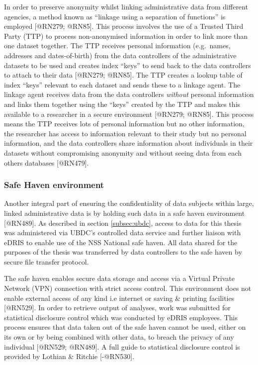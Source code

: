 \documentclass[]{article}
\begin{document}
In order to preserve anonymity whilst linking administrative data from
different agencies, a method known as ``linkage using a separation of
functions'' is employed {[}@RN279; @RN85{]}. This process involves the
use of a Trusted Third Party (TTP) to process non-anonymised information
in order to link more than one dataset together. The TTP receives
personal information (e.g.~names, addresses and dates-of-birth) from the
data controllers of the administrative datasets to be used and creates
index ``keys'' to send back to the data controllers to attach to their
data {[}@RN279; @RN85{]}. The TTP creates a lookup table of index
``keys'' relevant to each dataset and sends these to a linkage agent.
The linkage agent receives data from the data controllers
\textit{without} personal information and links them together using the
``keys'' created by the TTP and makes this available to a researcher in
a secure environment {[}@RN279; @RN85{]}. This process means the TTP
receives lots of personal information but no other information, the
researcher has access to information relevant to their study but no
personal information, and the data controllers share information about
individuals in their datasets without compromising anonymity and without
seeing data from each others databases {[}@RN479{]}.

\subsubsection{Safe Haven environment}\label{subsec:safe-haven}

Another integral part of ensuring the confidentiality of data subjects
within large, linked administrative data is by holding such data in a
safe haven environment {[}@RN489{]}. As described in section
\ref{subsec:ubdc}, access to data for this thesis was administered via
UBDC's controlled data service and further liaison with eDRIS to enable
use of the NSS National safe haven. All data shared for the purposes of
the thesis was transferred by data controllers to the safe haven by
secure file transfer protocol.

The safe haven enables secure data storage and access via a Virtual
Private Network (VPN) connection with strict access control. This
environment does not enable external access of any kind i.e internet or
saving \& printing facilities {[}@RN529{]}. In order to retrieve output
of analyses, work was submitted for statistical disclosure control which
was conducted by eDRIS employees. This process ensures that data taken
out of the safe haven cannot be used, either on its own or by being
combined with other data, to breach the privacy of any individual
{[}@RN529; @RN489{]}. A full guide to statistical disclosure control is
provided by Lothian \& Ritchie {[}-@RN530{]}.
\end{document}
